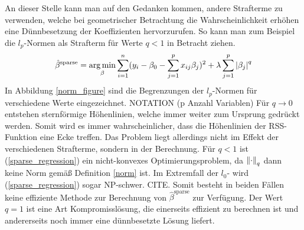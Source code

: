An dieser Stelle kann man auf den Gedanken kommen, andere Strafterme zu verwenden, welche bei geometrischer Betrachtung die Wahrscheinlichkeit erhöhen eine Dünnbesetzung der Koeffizienten hervorzurufen. So kann man zum Beispiel die $l_p$-Normen als Strafterm für Werte $q < 1$ in Betracht ziehen.
\begin{align}
\label{sparse_regression}
\hat{\beta}^{\text{sparse}} = \operatorname*{arg\,min}_{\beta} \sum_{i=1}^{n}(y_i - \beta_0 - \sum_{j=1}^p x_{ij}\beta_j)^2 + \lambda\sum_{j=1}^p \left|\beta_j\right|^q
\end{align}
In Abbildung \ref{norm_figure} sind die Begrenzungen der $l_p$-Normen für verschiedene Werte eingezeichnet. NOTATION (p Anzahl Variablen) Für $q \rightarrow 0$ entstehen sternförmige Höhenlinien, welche immer weiter zum Ursprung gedrückt werden. Somit wird es immer wahrscheinlicher, dass die Höhenlinien der RSS-Funktion eine Ecke treffen. Das Problem liegt allerdings nicht im Effekt der verschiedenen Strafterme, sondern in der Berechnung. Für $q < 1$ ist (\ref{sparse_regression}) ein nicht-konvexes Optimierungsproblem, da $\left\lVert \cdot \right\rVert_q$ dann keine Norm gemäß Definition \ref{norm} ist. Im Extremfall der $l_0$- wird (\ref{sparse_regression}) sogar NP-schwer. CITE. Somit besteht in beiden Fällen keine effiziente Methode zur Berechnung von $\hat{\beta}^{\text{sparse}}$ zur Verfügung. Der Wert $q = 1$ ist eine Art Kompromisslösung, die einerseits effizient zu berechnen ist und andererseits noch immer eine dünnbesetzte Lösung liefert.

